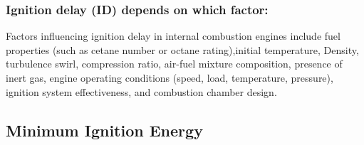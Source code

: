 \documentclass{article}
\begin{document}
\subsubsection*{Ignition delay (ID) depends on which factor:}
Factors influencing ignition delay in internal combustion engines include fuel properties (such as cetane number or octane rating),initial temperature, Density, turbulence swirl, compression ratio, air-fuel mixture composition, presence of inert gas, engine operating conditions (speed, load, temperature, pressure), ignition system effectiveness, and combustion chamber design.\\  

\subsection*{Minimum Ignition Energy}
\end{document}
